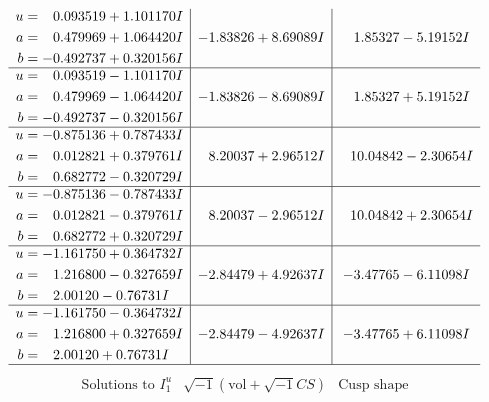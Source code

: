 \documentclass[1p]{elsarticle_modified}
\theoremstyle{definition}
\newcommand{\I}{\sqrt{-1}}
\begin{document}
$$\begin{array}{c|c|c}
\begin{aligned}
u &= \phantom{-}0.093519 + 1.101170 I \\
a &= \phantom{-}0.479969 + 1.064420 I \\
b &= -0.492737 + 0.320156 I\end{aligned}
 & -1.83826 + 8.69089 I & \phantom{-}1.85327 - 5.19152 I \\ \hline\begin{aligned}
u &= \phantom{-}0.093519 - 1.101170 I \\
a &= \phantom{-}0.479969 - 1.064420 I \\
b &= -0.492737 - 0.320156 I\end{aligned}
 & -1.83826 - 8.69089 I & \phantom{-}1.85327 + 5.19152 I \\ \hline\begin{aligned}
u &= -0.875136 + 0.787433 I \\
a &= \phantom{-}0.012821 + 0.379761 I \\
b &= \phantom{-}0.682772 - 0.320729 I\end{aligned}
 & \phantom{-}8.20037 + 2.96512 I & \phantom{-}10.04842 - 2.30654 I \\ \hline\begin{aligned}
u &= -0.875136 - 0.787433 I \\
a &= \phantom{-}0.012821 - 0.379761 I \\
b &= \phantom{-}0.682772 + 0.320729 I\end{aligned}
 & \phantom{-}8.20037 - 2.96512 I & \phantom{-}10.04842 + 2.30654 I \\ \hline\begin{aligned}
u &= -1.161750 + 0.364732 I \\
a &= \phantom{-}1.216800 - 0.327659 I \\
b &= \phantom{-}2.00120 - 0.76731 I\end{aligned}
 & -2.84479 + 4.92637 I & -3.47765 - 6.11098 I \\ \hline\begin{aligned}
u &= -1.161750 - 0.364732 I \\
a &= \phantom{-}1.216800 + 0.327659 I \\
b &= \phantom{-}2.00120 + 0.76731 I\end{aligned}
 & -2.84479 - 4.92637 I & -3.47765 + 6.11098 I\\
 \hline 
 \end{array}$$\newpage$$\begin{array}{c|c|c}  
\text{Solutions to }I^u_{1}& \I (\text{vol} + \sqrt{-1}CS) & \text{Cusp shape}\\

\end{array}$$
\end{document}
